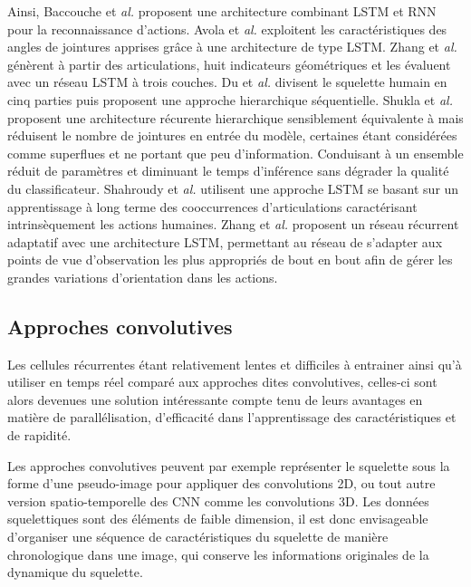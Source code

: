 Ainsi, Baccouche et\textit{ al.}\cite{baccouche2011sequential} proposent une architecture combinant LSTM et RNN pour la reconnaissance d'actions.
Avola et\textit{ al.} \cite{avola2018exploiting} exploitent les caractéristiques des angles de jointures apprises grâce à une architecture de type LSTM. 
Zhang et\textit{ al.}\cite{zhang2017geometric} génèrent à partir des articulations, huit indicateurs géométriques et les évaluent avec un réseau LSTM à trois couches.
Du et\textit{ al.}\cite{du2015hierarchical} divisent le squelette humain en cinq parties puis proposent une approche hierarchique séquentielle.
Shukla et\textit{ al.}\cite{shukla2017recurrent} proposent une architecture récurente hierarchique sensiblement équivalente à \cite{du2015hierarchical} mais réduisent le nombre de jointures en entrée du modèle, certaines étant considérées comme superflues et ne portant que peu d'information. Conduisant à un ensemble réduit de paramètres et diminuant le temps d'inférence sans dégrader la qualité du classificateur.
Shahroudy et\textit{ al.}\cite{shahroudy2016ntu} utilisent une approche LSTM se basant sur un apprentissage à long terme des cooccurrences d'articulations caractérisant intrinsèquement les actions humaines.
Zhang et\textit{ al.}\cite{zhang2017view} proposent un réseau récurrent adaptatif avec une architecture LSTM, permettant au réseau de s'adapter aux points de vue d'observation les plus appropriés de bout en bout afin de gérer les grandes variations d'orientation dans les actions.

 

\subsection{Approches convolutives}
Les cellules récurrentes étant relativement lentes et difficiles à entrainer ainsi qu'à utiliser en temps réel comparé aux approches dites convolutives, celles-ci sont alors devenues une solution intéressante compte tenu de leurs avantages en matière de parallélisation, d'efficacité dans l'apprentissage des caractéristiques et de rapidité.


Les approches convolutives peuvent par exemple représenter le squelette sous la forme d'une pseudo-image pour appliquer des convolutions 2D, ou tout autre version spatio-temporelle des CNN comme les convolutions 3D. Les données squelettiques sont des éléments de faible dimension, il est donc envisageable d'organiser une séquence de caractéristiques du squelette de manière chronologique dans une image, qui conserve les informations originales de la dynamique du squelette.

